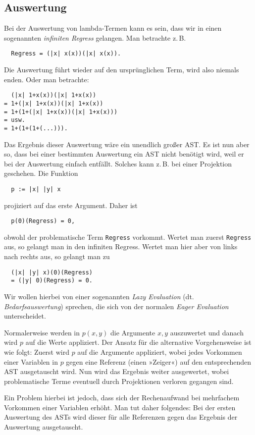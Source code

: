 \documentclass[a4paper,11pt,fleqn,twocolumn,twoside]{article}
\numberwithin{equation}{section}
\begin{document}
\subsection{Auswertung}

Bei der Auswertung von lambda-Termen kann es sein, dass wir in
einen sogenannten \emph{infiniten Regress} gelangen. Man betrachte
z.\,B.
\begin{verbatim}
  Regress = (|x| x(x))(|x| x(x)).
\end{verbatim}
Die Auswertung führt wieder auf den ursprünglichen Term, wird also
niemals enden. Oder man betrachte:
\begin{verbatim}
  (|x| 1+x(x))(|x| 1+x(x))
= 1+(|x| 1+x(x))(|x| 1+x(x))
= 1+(1+(|x| 1+x(x))(|x| 1+x(x)))
= usw.
= 1+(1+(1+(...))).
\end{verbatim}
Das Ergebnis dieser Auswertung wäre ein unendlich großer AST.
Es ist nun aber so, dass bei einer bestimmten Auswertung ein AST
nicht benötigt wird, weil er bei der Auswertung einfach entfällt.
Solches kann z.\,B. bei einer Projektion geschehen. Die Funktion
\begin{verbatim}
  p := |x| |y| x
\end{verbatim}
projiziert auf das erste Argument. Daher ist
\begin{verbatim}
  p(0)(Regress) = 0,
\end{verbatim}
obwohl der problematische Term \texttt{Regress} vorkommt.
Wertet man zuerst \texttt{Regress} aus, so gelangt man in den
infiniten Regress. Wertet man hier aber von links nach rechts aus,
so gelangt man zu
\begin{verbatim}
  (|x| |y| x)(0)(Regress)
  = (|y| 0)(Regress) = 0.
\end{verbatim}
Wir wollen hierbei von einer sogenannten \emph{Lazy Evaluation}
(dt. \emph{Bedarfsauswertung}) sprechen, die sich von der
normalen \emph{Eager Evaluation} unterscheidet.

Normalerweise werden in $p(x,y)$ die Argumente $x,y$ auszuwertet
und danach wird $p$ auf die Werte appliziert. Der Ansatz für die
alternative Vorgehensweise ist wie folgt: Zuerst wird $p$ auf die
Argumente appliziert, wobei jedes Vorkommen einer Variablen in $p$
gegen eine Referenz (einen »Zeiger«) auf den entsprechenden AST
ausgetauscht wird. Nun wird das Ergebnis weiter ausgewertet, wobei
problematische Terme eventuell durch Projektionen verloren gegangen
sind.

Ein Problem hierbei ist jedoch, dass sich der Rechenaufwand bei
mehrfachem Vorkommen einer Variablen erhöht. Man tut daher folgendes:
Bei der ersten Auswertung des ASTs wird dieser für alle Referenzen
gegen das Ergebnis der Auswertung ausgetauscht.
\end{document}
